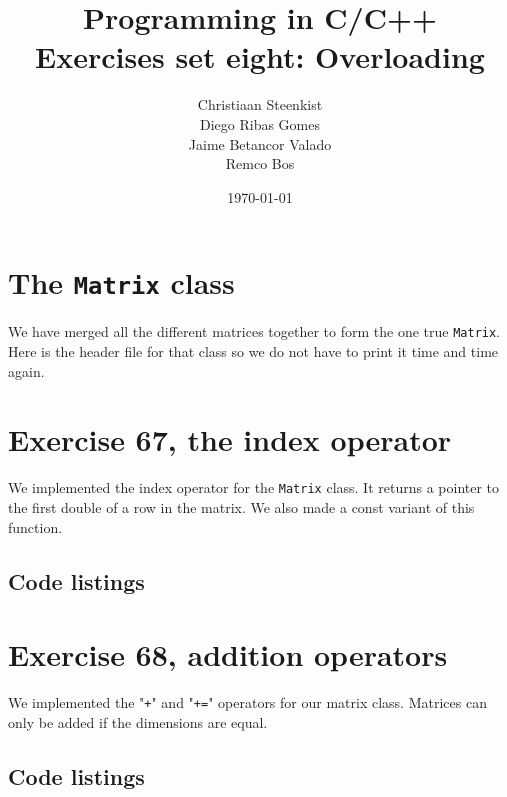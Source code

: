 \documentclass[11pt]{article}
\begin{document}
\title{Programming in C/C++ \\
       Exercises set eight: Overloading
}
\date{\today}
\author{Christiaan Steenkist \\
Diego Ribas Gomes \\
Jaime Betancor Valado \\
Remco Bos \\
}

\maketitle

\section*{The \texttt{Matrix} class}
We have merged all the different matrices together to form the one true \texttt{Matrix}.
Here is the header file for that class so we do not have to print it time and time again.



\section*{Exercise 67, the index operator}
We implemented the index operator for the \texttt{Matrix} class.
It returns a pointer to the first double of a row in the matrix.
We also made a const variant of this function.

\subsection*{Code listings}



\section*{Exercise 68, addition operators}
We implemented the "\texttt{+}" and "\texttt{+=}" operators for our matrix class.
Matrices can only be added if the dimensions are equal.

\subsection*{Code listings}


\end{document}
